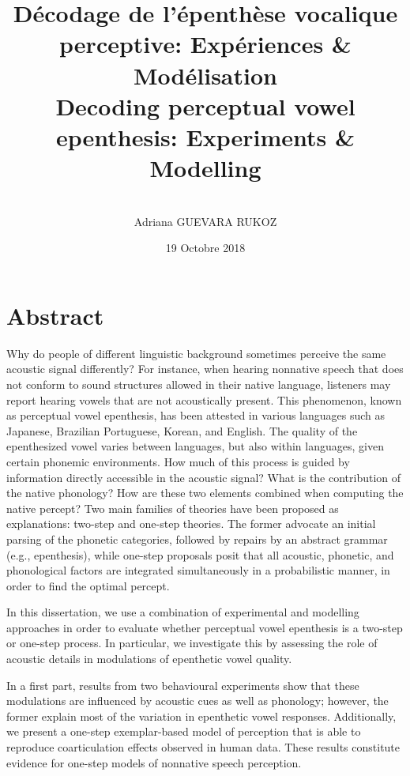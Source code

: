 \documentclass[12pt, twoside]{report}
\title{\large{Décodage de l'épenthèse vocalique perceptive: Expériences \& Modélisation \\
  \textbf{Decoding perceptual vowel epenthesis: Experiments \& Modelling}}}
\author{\\Adriana GUEVARA RUKOZ}
\date{19 Octobre 2018}
\begin{document}
\maketitle

\chapter*{Abstract}
Why do people of different linguistic background sometimes perceive the same acoustic signal differently? For instance, when hearing nonnative speech that does not conform to sound structures allowed in their native language, listeners may report hearing vowels that are not acoustically present. This phenomenon, known as perceptual vowel epenthesis, has been attested in various languages such as Japanese, Brazilian Portuguese, Korean, and English. The quality of the epenthesized vowel varies between languages, but also within languages, given certain phonemic environments. 
How much of this process is guided by information directly accessible in the acoustic signal? What is the contribution of the native phonology? How are these two elements combined when computing the native percept? Two main families of theories have been proposed as explanations: two-step and one-step theories. The former advocate an initial parsing of the phonetic categories, followed by repairs by an abstract grammar (e.g., epenthesis), while one-step proposals posit that all acoustic, phonetic, and phonological factors are integrated simultaneously in a probabilistic manner, in order to find the optimal percept.  

In this dissertation, we use a combination of experimental and modelling approaches in order to evaluate whether perceptual vowel epenthesis is a two-step or one-step process. In particular, we investigate this by assessing the role of acoustic details in modulations of epenthetic vowel quality.

In a first part, results from two behavioural experiments show that these modulations are influenced by acoustic cues as well as phonology; however, the former explain most of the variation in epenthetic vowel responses. Additionally, we present a one-step exemplar-based model of perception that is able to reproduce coarticulation effects observed in human data. These results constitute evidence for one-step models of nonnative speech perception.
\end{document}
